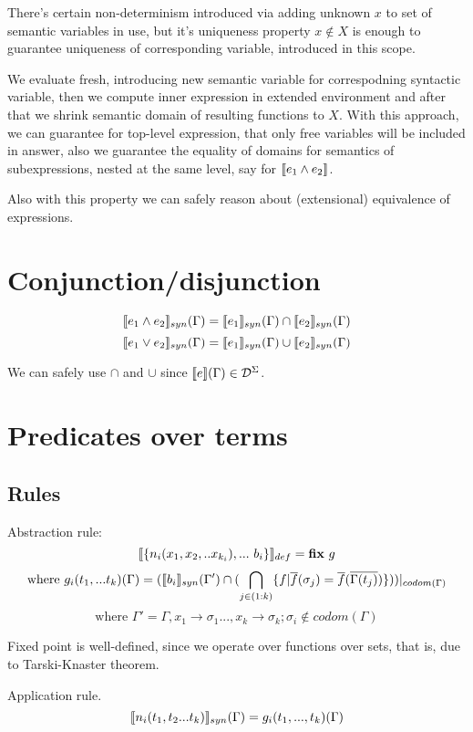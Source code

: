 \documentclass[fleqn]{article}
\begin{document}
There's certain non-determinism introduced via adding unknown \(x\) to set of semantic variables in use, but it's uniqueness property \(x \notin X\) is enough to guarantee uniqueness of corresponding variable, introduced in this scope.

We evaluate fresh, introducing new semantic variable for correspodning syntactic variable, then we compute inner expression in extended environment and after that we shrink semantic domain of resulting functions to \(X\). With this approach, we can guarantee for top-level expression, that only free variables will be included in answer, also we guarantee the equality of domains for semantics of subexpressions, nested at the same level, say for \(\llbracket e_1 \wedge e_2\rrbracket\). 

Also with this property we can safely reason about (extensional) equivalence of expressions.


\section{Conjunction/disjunction}
\[\llbracket e_1 \wedge e_2\rrbracket_{syn}(\Gamma) = \llbracket e_1\rrbracket_{syn}(\Gamma) \cap \llbracket e_2\rrbracket_{syn}(\Gamma)\]
\[\llbracket e_1 \vee e_2\rrbracket_{syn}(\Gamma) = \llbracket e_1\rrbracket_{syn}(\Gamma) \cup \llbracket e_2\rrbracket_{syn}(\Gamma)\]

We can safely use \(\cap\) and \(\cup\) since \(\llbracket e\rrbracket(\Gamma) \in \mathcal{D}^\Sigma\).

\section{Predicates over terms} 
\subsection{Rules}

Abstraction rule:
\[\llbracket\{n_i(x_1, x_2, .. x_{k_i}), ...\ b_i\} \rrbracket_{def} = \textrm{\textbf{fix}}\ g  \]
\[ \textrm{where } g_i(t_1,...t_k)(\Gamma) = (\llbracket b_i\rrbracket_{syn}(\Gamma' ) \cap (\bigcap_{j \in (1:k)} \{ f | \overline{f}(\sigma_j) = \overline{f}(\overline{\Gamma(t_j)}) \} ))|_{codom(\Gamma)} \]
\[\textrm{where } \Gamma' = \Gamma, x_1 \rightarrow \sigma_1 ..., x_k \rightarrow \sigma_k; \sigma_i \notin codom(\Gamma) \]

Fixed point is well-defined, since we operate over functions over sets, that is, due to Tarski-Knaster theorem.

Application rule.
\[ \llbracket n_i(t_1, t_2 ... t_k)\rrbracket_{syn}(\Gamma) = g_i(t_1, ... , t_k)(\Gamma) \]
\end{document}
